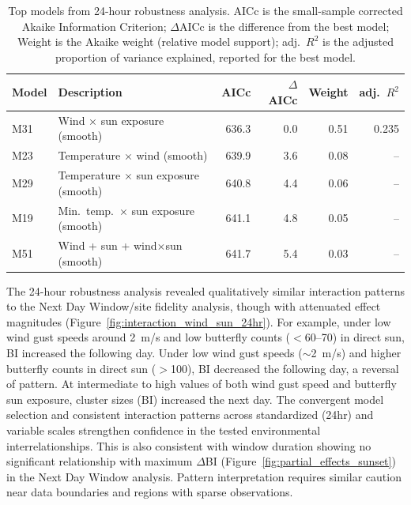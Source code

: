 \documentclass[insects,article,submit,pdftex,moreauthors]{Definitions/mdpi}
\begin{document}
\begin{table}[H]
\caption{Top models from 24-hour robustness analysis. AICc is the small-sample corrected Akaike Information Criterion; $\Delta$AICc is the difference from the best model; Weight is the Akaike weight (relative model support); adj.\ $R^{2}$ is the adjusted proportion of variance explained, reported for the best model.}
\label{tab:24hr_model_selection}
\centering
\small
\begin{tabular}{llrrrr}
\toprule
\textbf{Model} & \textbf{Description} & \textbf{AICc} & \textbf{$\Delta$AICc} & \textbf{Weight} & \textbf{adj.\ $R^{2}$} \\
\midrule
M31 & Wind $\times$ sun exposure (smooth) & 636.3 & 0.0 & 0.51 & 0.235 \\
M23 & Temperature $\times$ wind (smooth) & 639.9 & 3.6 & 0.08 & -- \\
M29 & Temperature $\times$ sun exposure (smooth) & 640.8 & 4.4 & 0.06 & -- \\
M19 & Min.\ temp.\ $\times$ sun exposure (smooth) & 641.1 & 4.8 & 0.05 & -- \\
M51 & Wind + sun + wind$\times$sun (smooth) & 641.7 & 5.4 & 0.03 & -- \\
\bottomrule
\end{tabular}
\end{table}

The 24-hour robustness analysis revealed qualitatively similar interaction patterns to the Next Day Window/site fidelity analysis, though with attenuated effect magnitudes (Figure~\ref{fig:interaction_wind_sun_24hr}). For example, under low wind gust speeds around 2~m/s and low butterfly counts ($<$60--70) in direct sun, BI increased the following day. Under low wind gust speeds ($\sim$2~m/s) and higher butterfly counts in direct sun ($>$100), BI decreased the following day, a reversal of pattern. At intermediate to high values of both wind gust speed and butterfly sun exposure, cluster sizes (BI) increased the next day. The convergent model selection and consistent interaction patterns across standardized (24hr) and variable scales strengthen confidence in the tested environmental interrelationships. This is also consistent with window duration showing no significant relationship with maximum $\Delta$BI (Figure~\ref{fig:partial_effects_sunset}) in the Next Day Window analysis. Pattern interpretation requires similar caution near data boundaries and regions with sparse observations.
\end{document}
